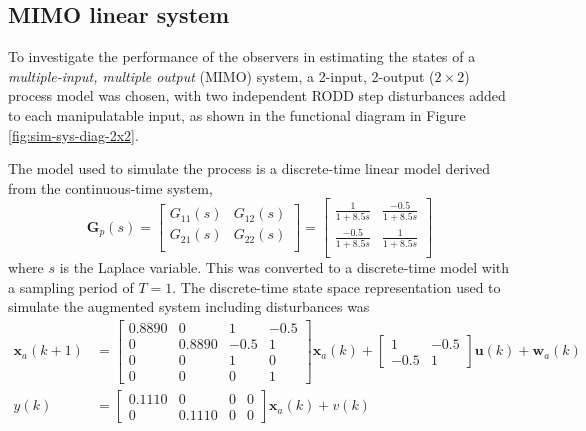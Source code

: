 \subsection{MIMO linear system} \label{sim-obs-lin-2}

To investigate the performance of the observers in estimating the states of a \textit{multiple-input, multiple output} (MIMO) system, a 2-input, 2-output ($2\times2$) process model was chosen, with two independent \gls{RODD} step disturbances added to each manipulatable input, as shown in the functional diagram in Figure \ref{fig:sim-sys-diag-2x2}. 

The model used to simulate the process is a discrete-time linear model derived from the continuous-time system,
\begin{equation} \label{eq:sim-sys-siso--ct}
	\mathbf{G}_p(s) = \left[\begin{array}{cc}
		G_{11}(s) & G_{12}(s)  \\
		G_{21}(s) & G_{22}(s)  \\
	\end{array}\right] = \left[\begin{array}{cc}
		\frac{1}{1+8.5s} & \frac{-0.5}{1+8.5s}  \\
		\frac{-0.5}{1+8.5s} & \frac{1}{1+8.5s}  \\
	\end{array}\right]
\end{equation}
where $s$ is the Laplace variable.  This was converted to a discrete-time model with a sampling period of $T=1$. The discrete-time state space representation used to simulate the augmented system including disturbances was
\begin{equation} \label{eq:sim-sys-2x2-ss-aug}
	\begin{split}
		\mathbf{x}_{a}(k+1) & =\left[\begin{array}{cccc}
			0.8890 & 0 & 1 & -0.5 \\
			0 & 0.8890 & -0.5 & 1 \\
			0 & 0 & 1 & 0 \\
			0 & 0 & 0 & 1
		\end{array}\right] \mathbf{x}_{a}(k) + \left[\begin{array}{cc}
			1 & -0.5 \\
			-0.5 & 1
		\end{array}\right] \mathbf{u}(k) + \mathbf{w}_{a}(k) \\
		y(k) & =\left[\begin{array}{cccc}
			0.1110 & 0 & 0 & 0 \\
			0 & 0.1110 & 0 & 0
		\end{array}\right] \mathbf{x}_{a}(k) + v(k)
	\end{split}
\end{equation}
